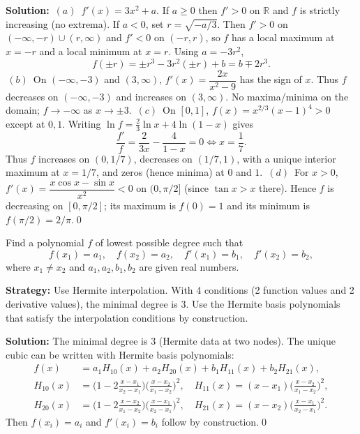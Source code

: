 \bigskip\noindent\textbf{Solution:}
\(\,(a)\,\) $f'(x)=3x^2+a$. If $a\ge 0$ then $f'>0$ on $\mathbb{R}$ and $f$ is strictly increasing (no extrema). If $a<0$, set $r=\sqrt{-a/3}$. Then $f'>0$ on $(-\infty,-r)\cup(r,\infty)$ and $f'<0$ on $(-r,r)$, so $f$ has a local maximum at $x=-r$ and a local minimum at $x=r$. Using $a=-3r^2$,
\[f(\pm r)=\pm r^3-3r^2(\pm r)+b=b\mp 2r^3.\]
\(\,(b)\,\) On $(-\infty,-3)$ and $(3,\infty)$, $f'(x)=\dfrac{2x}{x^2-9}$ has the sign of $x$. Thus $f$ decreases on $(-\infty,-3)$ and increases on $(3,\infty)$. No maxima/minima on the domain; $f\to-\infty$ as $x\to\pm3$.\newline
\(\,(c)\,\) On $[0,1]$, $f(x)=x^{2/3}(x-1)^4>0$ except at $0,1$. Writing $\ln f=\tfrac23\ln x+4\ln(1-x)$ gives
\[\frac{f'}{f}=\frac{2}{3x}-\frac{4}{1-x}=0\iff x=\frac17.\]
Thus $f$ increases on $(0,1/7)$, decreases on $(1/7,1)$, with a unique interior maximum at $x=1/7$, and zeros (hence minima) at $0$ and $1$.\newline
\(\,(d)\,\) For $x>0$, $f'(x)=\dfrac{x\cos x-\sin x}{x^2}<0$ on $(0,\pi/2]$ (since $\tan x> x$ there). Hence $f$ is decreasing on $[0,\pi/2]$; its maximum is $f(0)=1$ and its minimum is $f(\pi/2)=2/\pi$.\qed


\begin{problembox}
\begin{problemstatement}
Find a polynomial \( f \) of lowest possible degree such that
\[ f(x_1) = a_1, \quad f(x_2) = a_2, \quad f'(x_1) = b_1, \quad f'(x_2) = b_2, \]
where \( x_1 \neq x_2 \) and \( a_1, a_2, b_1, b_2 \) are given real numbers.
\end{problemstatement}
\end{problembox}

\noindent\textbf{Strategy:} Use Hermite interpolation. With 4 conditions (2 function values and 2 derivative values), the minimal degree is 3. Use the Hermite basis polynomials that satisfy the interpolation conditions by construction.

\bigskip\noindent\textbf{Solution:}
The minimal degree is \textbf{$3$} (Hermite data at two nodes). The unique cubic can be written with Hermite basis polynomials:
\[\begin{aligned}
f(x)&=a_1 H_{10}(x)+a_2 H_{20}(x)+b_1 H_{11}(x)+b_2 H_{21}(x),\\
H_{10}(x)&=\Big(1-2\frac{x-x_1}{x_2-x_1}\Big)\Big(\frac{x-x_2}{x_1-x_2}\Big)^2,\quad H_{11}(x)=(x-x_1)\Big(\frac{x-x_2}{x_1-x_2}\Big)^2,\\
H_{20}(x)&=\Big(1-2\frac{x-x_2}{x_1-x_2}\Big)\Big(\frac{x-x_1}{x_2-x_1}\Big)^2,\quad H_{21}(x)=(x-x_2)\Big(\frac{x-x_1}{x_2-x_1}\Big)^2.
\end{aligned}\]
Then $f(x_i)=a_i$ and $f'(x_i)=b_i$ follow by construction.\qed


